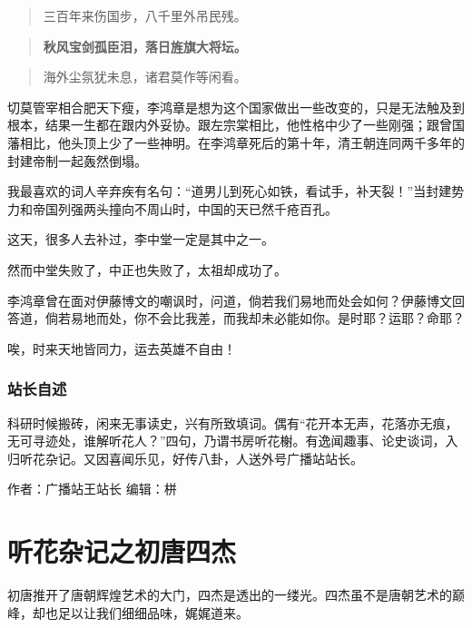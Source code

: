 \documentclass[]{book}
\begin{document}
\begin{quote}
三百年来伤国步，八千里外吊民残。
\end{quote}

\begin{quote}
\textbf{秋风宝剑孤臣泪，落日旌旗大将坛。}
\end{quote}

\begin{quote}
海外尘氛犹未息，诸君莫作等闲看。
\end{quote}

切莫管宰相合肥天下瘦，李鸿章是想为这个国家做出一些改变的，只是无法触及到根本，结果一生都在跟内外妥协。跟左宗棠相比，他性格中少了一些刚强；跟曾国藩相比，他头顶上少了一些神明。在李鸿章死后的第十年，清王朝连同两千多年的封建帝制一起轰然倒塌。

我最喜欢的词人辛弃疾有名句：``道男儿到死心如铁，看试手，补天裂！''当封建势力和帝国列强两头撞向不周山时，中国的天已然千疮百孔。

这天，很多人去补过，李中堂一定是其中之一。

然而中堂失败了，中正也失败了，太祖却成功了。

李鸿章曾在面对伊藤博文的嘲讽时，问道，倘若我们易地而处会如何？伊藤博文回答道，倘若易地而处，你不会比我差，而我却未必能如你。是时耶？运耶？命耶？

唉，时来天地皆同力，运去英雄不自由！

\hypertarget{ux7ad9ux957fux81eaux8ff0}{%
\subsubsection*{站长自述}\label{ux7ad9ux957fux81eaux8ff0}}

科研时候搬砖，闲来无事读史，兴有所致填词。偶有``花开本无声，花落亦无痕，无可寻迹处，谁解听花人？''四句，乃谓书房听花榭。有逸闻趣事、论史谈词，入归听花杂记。又因喜闻乐见，好传八卦，人送外号广播站站长。

作者：广播站王站长
编辑：栟

\hypertarget{ux542cux82b1ux6742ux8bb0ux4e4bux521dux5510ux56dbux6770}{%
\section{听花杂记之初唐四杰}\label{ux542cux82b1ux6742ux8bb0ux4e4bux521dux5510ux56dbux6770}}

初唐推开了唐朝辉煌艺术的大门，四杰是透出的一缕光。四杰虽不是唐朝艺术的巅峰，却也足以让我们细细品味，娓娓道来。
\end{document}
